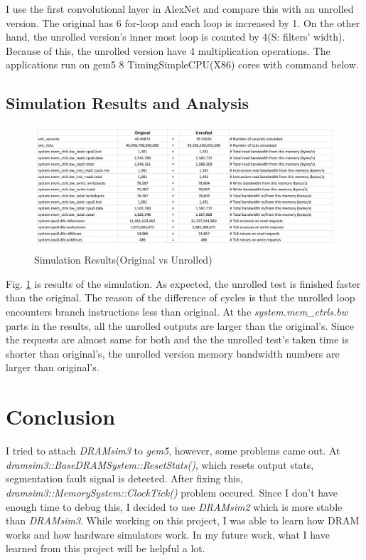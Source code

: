 \documentclass[conference]{IEEEtran}
\begin{document}
I use the first convolutional layer in AlexNet and compare this with an unrolled version.
The original has 6 for-loop and each loop is increased by 1.
On the other hand, the unrolled version's inner most loop is counted by 4(S: filters' width).
Because of this, the unrolled version have 4 multiplication operations.
The applications run on gem5 8 TimingSimpleCPU(X86) cores with command below.


\subsection{Simulation Results and Analysis}

\begin{figure}
    \centering
    \includegraphics[width=1.00\linewidth]{image/m5out.pdf}
	\caption{Simulation Results(Original vs Unrolled)}
    \label{fig:m5out}
\end{figure}

Fig. \ref{fig:m5out} is results of the simulation. 
As expected, the unrolled test is finished faster than the original.
The reason of the difference of cycles is that the unrolled loop encounters branch instructions less than original.
At the \emph{system.mem\_ctrls.bw} parts in the results, all the unrolled outputs are larger than the original's.
Since the requests are almost same for both and the the unrolled test's taken time is shorter than original's, the unrolled version memory bandwidth numbers are larger than original's. 

\section{Conclusion} \label{sec:conclusion}
I tried to attach \emph{DRAMsim3} to \emph{gem5}, however, some problems came out.
At \emph{dramsim3::BaseDRAMSystem::ResetStats()}, which resets output stats, segmentation fault signal is detected.  
After fixing this, \emph{dramsim3::MemorySystem::ClockTick()} problem occured. 
Since I don't have enough time to debug this, I decided to use \emph{DRAMsim2} which is more stable than \emph{DRAMsim3}.
While working on this project, I was able to learn how DRAM works and how hardware simulators work.
In my future work, what I have learned from this project will be helpful a lot. 



\end{document}
